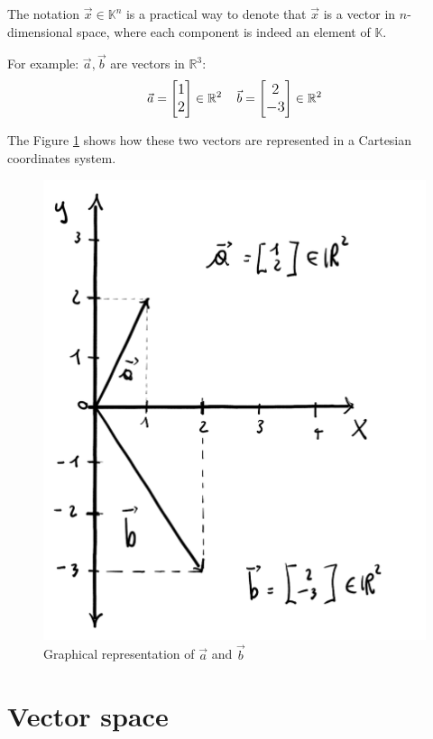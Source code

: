  
The notation $\vec{x} \in \mathbb{K}^n$ is a practical way to denote that $\vec{x}$ is a vector in $n$-dimensional space, where each component is indeed an element of $\mathbb{K}$.

For example: \(\vec{a}, \vec{b}\) are vectors in $\mathbb{R}^3$:
\[
\large
\vec{a} = \begin{bmatrix}1 \\ 2 \end{bmatrix} \in \mathbb{R}^2
\quad
\vec{b} = \begin{bmatrix}2 \\ -3\end{bmatrix} \in \mathbb{R}^2
\]

The Figure \ref{fig:letsstart} shows how these two vectors are represented in a Cartesian coordinates system.
\begin{figure}[h]
    \centering
    \includegraphics[scale=0.2]{Images/Linear_Algebra-letsstart.png}
    \caption{Graphical representation of $\vec a$ and $\vec b$}
    \label{fig:letsstart}
\end{figure}

\section{Vector space}

